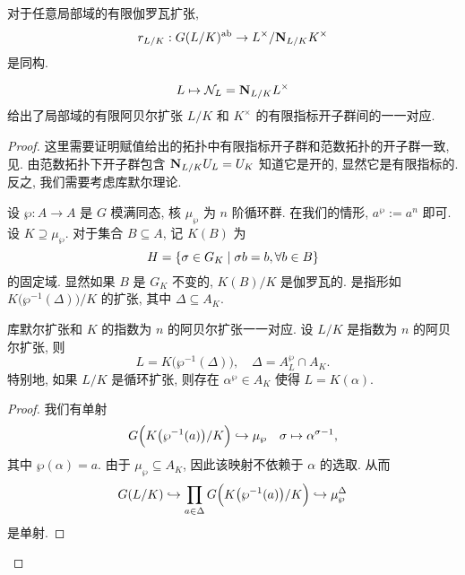 \begin{theorem}{}{}
对于任意局部域的有限伽罗瓦扩张,
  \[r_{L/K}:G(L/K)^{\mathrm{ab}}\to L^\times/{\mathbf{N}}_{L/K}K^\times\]
是同构.
\end{theorem}
\begin{theorem}{}{}
  \[L\mapsto {\mathcal{N}}_L={\mathbf{N}}_{L/K}L^\times\]
给出了局部域的有限阿贝尔扩张 $L/K$ 和 $K^\times$ 的有限指标开子群间的一一对应.
\end{theorem}
\begin{proof}
这里需要证明赋值给出的拓扑中有限指标开子群和范数拓扑的开子群一致, 见\cite[Theorem~5.1.4]{Neukirch1999}. 由范数拓扑下开子群包含 ${\mathbf{N}}_{L/K}U_L=U_K$ 知道它是开的, 显然它是有限指标的. 反之, 我们需要考虑库默尔理论.

设 $\wp:A\to A$ 是 $G$ 模满同态, 核 $\mu_\wp$ 为 $n$ 阶循环群. 在我们的情形, $a^\wp:=a^n$ 即可. 设 $K\supseteq \mu_\wp$. 对于集合 $B\subseteq A$, 记 $K(B)$ 为
  \[H=\left\{\sigma\in G_K\mid \sigma b=b,\forall b\in B\right\}\]
的固定域. 显然如果 $B$ 是 $G_K$ 不变的, $K(B)/K$ 是伽罗瓦的. 是指形如 $K\bigl(\wp^{-1}(\Delta)\bigr)/K$ 的扩张, 其中 $\Delta\subseteq A_K$.

\begin{proposition}{}{}
库默尔扩张和 $K$ 的指数为 $n$ 的阿贝尔扩张一一对应. 设 $L/K$ 是指数为 $n$ 的阿贝尔扩张, 则
  \[L=K\bigl(\wp^{-1}(\Delta)\bigr),\quad \Delta=
A_L^\wp\cap A_K.\]
特别地, 如果 $L/K$ 是循环扩张, 则存在 $\alpha^\wp\in A_K$ 使得 $L=K(\alpha)$.
\end{proposition}
\begin{proof}
我们有单射
  \[G\Bigl(K\bigl(\wp^{-1}(a)\bigr)/K\Bigr)\hookrightarrow \mu_\wp
\quad \sigma\mapsto \alpha^{\sigma-1},\]
其中 $\wp(\alpha)=a$. 由于 $\mu_\wp\subseteq A_K$, 因此该映射不依赖于 $\alpha$ 的选取. 从而
  \[G(L/K)\hookrightarrow \prod_{a\in\Delta}G\Bigl(K\bigl(\wp^{-1}(a)\bigr)/K\Bigr)\hookrightarrow \mu_\wp^\Delta\]
是单射.


\end{proof}
\end{proof}

